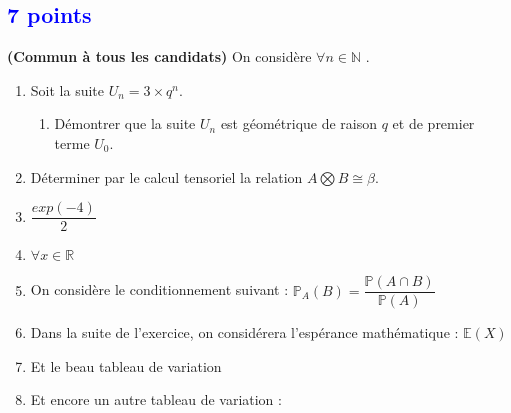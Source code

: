\documentclass[11pt]{article}
\newcommand{\hard}[2]{\hspace*{0.5cm} \textbf{( !!! )}\\}
\newcommand{\R}{\mathbb{R}} %
\newcommand{\N}{\mathbb{N}} %
\newcommand{\E}{\mathbb{E}} %
\renewcommand{\P}{\mathbb{P}} %
\begin{document}


\subsection{\textcolor{blue}{\hfill 7 points}}
\label{courbe}

\medskip
\noindent\textbf{(Commun à tous les candidats) \hard }
\medskip
On considère $\forall n \in \N$ . \\

\begin{enumerate}

\item Soit la suite $U_{n}=3 \times q^{n}$.

\begin{enumerate}

\item Démontrer que la suite $U_{n}$ est géométrique de raison $q$ et de premier terme $U_{0}$. 

\end{enumerate}

\item Déterminer par le calcul tensoriel la relation $A \bigotimes B \cong \beta$.

\item $\dfrac{exp (-4)}{2}$

\item $\forall x \in \R$

\item On considère le conditionnement suivant : $\P_{A}(B) = \dfrac{\P(A \cap B)}{\P(A)}$
\item Dans la suite de l'exercice, on considérera l'espérance mathématique : $\E(X)$

\item Et le beau tableau de variation\\

\begin{center}


\end{center}

\item Et encore un autre tableau de variation : \\

\begin{center}


\end{center}





\end{enumerate}


\medskip
\end{document}
